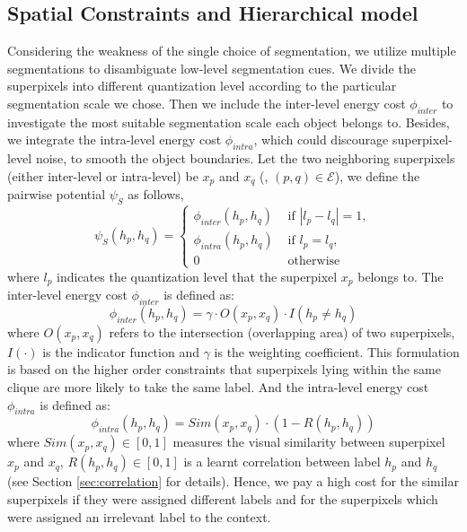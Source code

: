 \subsection{Spatial Constraints and Hierarchical model}
Considering the weakness of the single choice of segmentation, we utilize multiple segmentations to disambiguate low-level segmentation cues. We divide the superpixels into different quantization level according to the particular segmentation scale we chose. Then we include the inter-level energy cost $\phi_{inter}$ to investigate the most suitable segmentation scale each object belongs to. Besides, we integrate the intra-level energy cost $\phi_{intra}$, which could discourage superpixel-level noise, to smooth the object boundaries. Let the two neighboring superpixels (either inter-level or intra-level) be $x_p$ and $x_q$ (\ie, $(p,q) \in \mathcal{E}$), we define the pairwise potential $\psi_S$ as follows,
\begin{equation}
    \psi_{S}(h_p,h_q) =
    \begin{cases}
        \phi_{inter}(h_p,h_q) &\mbox{ if } | l_p - l_q | = 1,
        \\
        \phi_{intra}(h_p,h_q) &\mbox{ if } l_p = l_q,
        \\
        0 &\mbox{ otherwise }
    \end{cases}
\end{equation}
where $l_p$ indicates the quantization level that the superpixel $x_p$ belongs to.
The inter-level energy cost $\phi_{inter}$ is defined as:
\begin{equation}
    \phi_{inter}(h_p,h_q) = \gamma \cdot O(x_p,x_q) \cdot I(h_p \neq h_q)
\end{equation}
where $O(x_p,x_q)$ refers to the intersection (overlapping area) of two superpixels, $I(\cdot)$ is the indicator function and $\gamma$ is the weighting coefficient. This formulation is based on the higher order constraints \cite{kohli2009robust,ladicky2009associative} that superpixels lying within the same clique are more likely to take the same label.
And the intra-level energy cost $\phi_{intra}$ is defined as:
\begin{equation}
    \phi_{intra}(h_p,h_q) = Sim(x_p,x_q) \cdot (1-R(h_p,h_q))
\end{equation}
where $Sim(x_p,x_q) \in [0,1]$ measures the visual similarity between superpixel $x_p$ and $x_q$, $R(h_p,h_q) \in [0,1]$ is a learnt correlation between label $h_p$ and $h_q$ (see Section \ref{sec:correlation} for details). Hence, we pay a high cost for the similar superpixels if they were assigned different labels and for the superpixels which were assigned an irrelevant label to the context.

